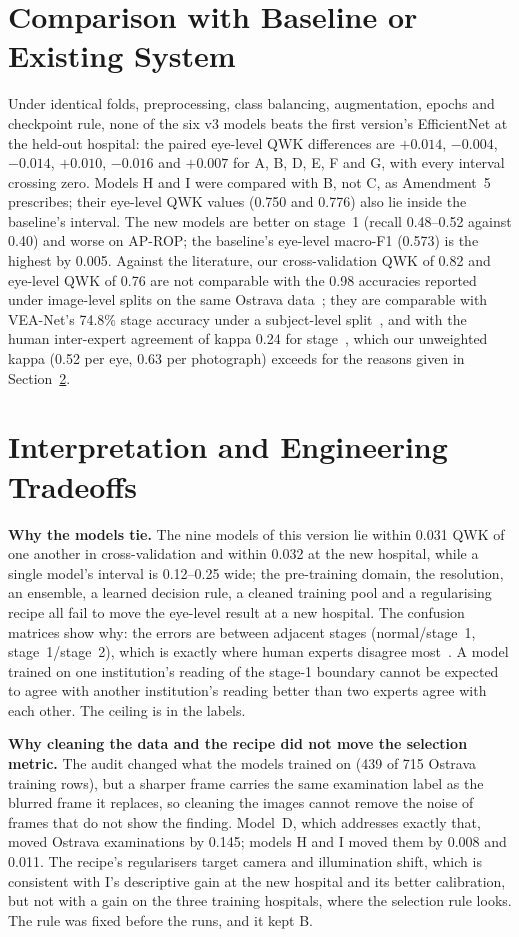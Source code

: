 \section{Comparison with Baseline or Existing System}
Under identical folds, preprocessing, class balancing, augmentation, epochs and checkpoint rule, none of the six v3 models beats the first version's EfficientNet at the held-out hospital: the paired eye-level QWK differences are $+0.014$, $-0.004$, $-0.014$, $+0.010$, $-0.016$ and $+0.007$ for A, B, D, E, F and G, with every interval crossing zero. Models H and I were compared with B, not C, as Amendment~5 prescribes; their eye-level QWK values (0.750 and 0.776) also lie inside the baseline's interval. The new models are better on stage~1 (recall 0.48--0.52 against 0.40) and worse on AP-ROP; the baseline's eye-level macro-F1 (0.573) is the highest by 0.005. Against the literature, our cross-validation QWK of 0.82 and eye-level QWK of 0.76 are not comparable with the 0.98 accuracies reported under image-level splits on the same Ostrava data~\cite{vahid2026}; they are comparable with VEA-Net's 74.8\% stage accuracy under a subject-level split~\cite{wang2026}, and with the human inter-expert agreement of kappa 0.24 for stage~\cite{gschliesser2015}, which our unweighted kappa (0.52 per eye, 0.63 per photograph) exceeds for the reasons given in Section~\ref{sec:interp}.

\section{Interpretation and Engineering Tradeoffs}\label{sec:interp}
\textbf{Why the models tie.} The nine models of this version lie within 0.031 QWK of one another in cross-validation and within 0.032 at the new hospital, while a single model's interval is 0.12--0.25 wide; the pre-training domain, the resolution, an ensemble, a learned decision rule, a cleaned training pool and a regularising recipe all fail to move the eye-level result at a new hospital. The confusion matrices show why: the errors are between adjacent stages (normal/stage~1, stage~1/stage~2), which is exactly where human experts disagree most~\cite{campbell2016}. A model trained on one institution's reading of the stage-1 boundary cannot be expected to agree with another institution's reading better than two experts agree with each other. The ceiling is in the labels.

\textbf{Why cleaning the data and the recipe did not move the selection metric.} The audit changed what the models trained on (439 of 715 Ostrava training rows), but a sharper frame carries the same examination label as the blurred frame it replaces, so cleaning the images cannot remove the noise of frames that do not show the finding. Model~D, which addresses exactly that, moved Ostrava examinations by 0.145; models H and I moved them by 0.008 and 0.011. The recipe's regularisers target camera and illumination shift, which is consistent with I's descriptive gain at the new hospital and its better calibration, but not with a gain on the three training hospitals, where the selection rule looks. The rule was fixed before the runs, and it kept B.

